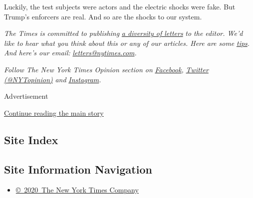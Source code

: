 Luckily, the test subjects were actors and the electric shocks were
fake. But Trump's enforcers are real. And so are the shocks to our
system.

\emph{The Times is committed to publishing}
\href{https://www.nytimes.com/2019/01/31/opinion/letters/letters-to-editor-new-york-times-women.html}{\emph{a
diversity of letters}} \emph{to the editor. We'd like to hear what you
think about this or any of our articles. Here are some}
\href{https://help.nytimes.com/hc/en-us/articles/115014925288-How-to-submit-a-letter-to-the-editor}{\emph{tips}}\emph{.
And here's our email:}
\href{mailto:letters@nytimes.com}{\emph{letters@nytimes.com}}\emph{.}

\emph{Follow The New York Times Opinion section on}
\href{https://www.facebook.com/nytopinion}{\emph{Facebook}}\emph{,}
\href{http://twitter.com/NYTOpinion}{\emph{Twitter (@NYTopinion)}}
\emph{and}
\href{https://www.instagram.com/nytopinion/}{\emph{Instagram}}\emph{.}

Advertisement

\protect\hyperlink{after-bottom}{Continue reading the main story}

\hypertarget{site-index}{%
\subsection{Site Index}\label{site-index}}

\hypertarget{site-information-navigation}{%
\subsection{Site Information
Navigation}\label{site-information-navigation}}

\begin{itemize}
\tightlist
\item
  \href{https://help.nytimes.com/hc/en-us/articles/115014792127-Copyright-notice}{©~2020~The
  New York Times Company}
\end{itemize}

